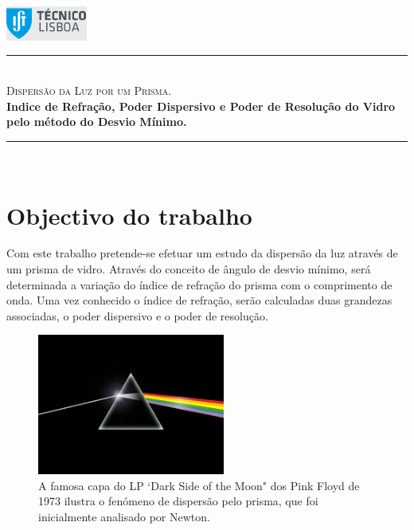 \documentclass[a4paper,12pt]{article}  %
\author{Prof. Bernardo B. Carvalho}
\date{ Outubro 2012}
\newcommand{\HRule}{\rule{\linewidth}{0.5mm}}
\begin{document}
 

	\includegraphics[width=0.2\textwidth]{../logo-ist}%

	\HRule \\[0.5cm]
	{ \huge \sf  \textsc{Dispersão da Luz por um Prisma.}} \\[0.4cm] %
	{ \large \bfseries Indice de Refração, Poder Dispersivo e Poder de Resolução do Vidro pelo método do Desvio Mínimo.}\\
	\HRule \\%

\section{\sf Objectivo do trabalho}
Com este trabalho pretende-se efetuar um estudo da dispersão da luz através de um prisma de vidro. Através do conceito de ângulo de desvio mínimo, será determinada a variação do índice de refração do prisma com o comprimento de onda. Uma vez conhecido o índice de refração, serão calculadas duas grandezas associadas, o poder dispersivo e o poder de resolução.

\begin{figure}[h!b]  \centering 
	\includegraphics[width=0.55\textwidth]{darkside}
	\caption{A famosa capa do LP `Dark Side of the Moon" dos Pink Floyd de 1973 ilustra  o fenómeno de dispersão pelo prisma, que foi inicialmente  analisado por Newton.\label{fig:darkside}} 
\end{figure}
\end{document}
